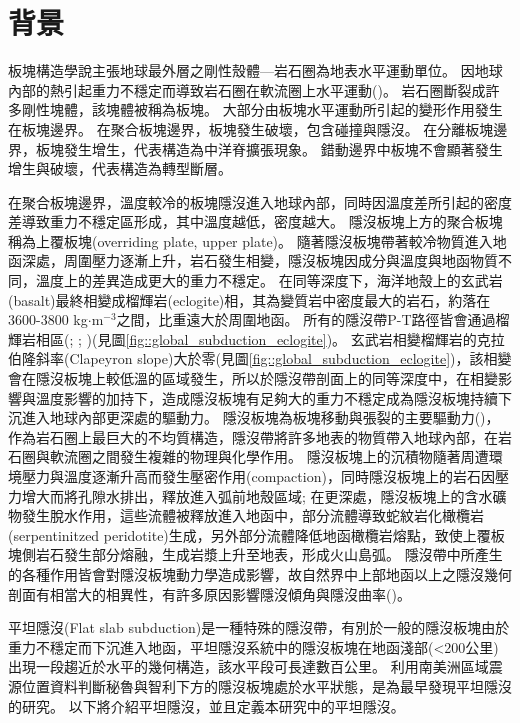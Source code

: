 \section{背景}\label{背景}

板塊構造學說主張地球最外層之剛性殼體---岩石圈為地表水平運動單位。
因地球內部的熱引起重力不穩定而導致岩石圈在軟流圈上水平運動(\citealp{jordan1978composition})。
岩石圈斷裂成許多剛性塊體，該塊體被稱為板塊。
大部分由板塊水平運動所引起的變形作用發生在板塊邊界。
在聚合板塊邊界，板塊發生破壞，包含碰撞與隱沒。
在分離板塊邊界，板塊發生增生，代表構造為中洋脊擴張現象。
錯動邊界中板塊不會顯著發生增生與破壞，代表構造為轉型斷層。

在聚合板塊邊界，溫度較冷的板塊隱沒進入地球內部，同時因溫度差所引起的密度差導致重力不穩定區形成，其中溫度越低，密度越大。
隱沒板塊上方的聚合板塊稱為上覆板塊(overriding plate, upper plate)。
隨著隱沒板塊帶著較冷物質進入地函深處，周圍壓力逐漸上升，岩石發生相變，隱沒板塊因成分與溫度與地函物質不同，溫度上的差異造成更大的重力不穩定。
在同等深度下，海洋地殼上的玄武岩(basalt)最終相變成榴輝岩(eclogite)相，其為變質岩中密度最大的岩石，約落在3600-3800 kg$\cdot$m$^{-3}$之間，比重遠大於周圍地函。
所有的隱沒帶P-T路徑皆會通過榴輝岩相區(\citealp{gerya2002exhumation}; \citealp{syracuse2010global}; \citealp{penniston2015global})(見圖\ref{fig::global_subduction_eclogite})。
玄武岩相變榴輝岩的克拉伯隆斜率(Clapeyron slope)大於零(見圖\ref{fig::global_subduction_eclogite})，該相變會在隱沒板塊上較低溫的區域發生，所以於隱沒帶剖面上的同等深度中，在相變影響與溫度影響的加持下，造成隱沒板塊有足夠大的重力不穩定成為隱沒板塊持續下沉進入地球內部更深處的驅動力。
隱沒板塊為板塊移動與張裂的主要驅動力(\citealp{turcotte2002geodynamics})，作為岩石圈上最巨大的不均質構造，隱沒帶將許多地表的物質帶入地球內部，在岩石圈與軟流圈之間發生複雜的物理與化學作用。
隱沒板塊上的沉積物隨著周遭環境壓力與溫度逐漸升高而發生壓密作用(compaction)，同時隱沒板塊上的岩石因壓力增大而將孔隙水排出，釋放進入弧前地殼區域; 在更深處，隱沒板塊上的含水礦物發生脫水作用，這些流體被釋放進入地函中，部分流體導致蛇紋岩化橄欖岩(serpentinitzed peridotite)生成，另外部分流體降低地函橄欖岩熔點，致使上覆板塊側岩石發生部分熔融，生成岩漿上升至地表，形成火山島弧。
隱沒帶中所產生的各種作用皆會對隱沒板塊動力學造成影響，故自然界中上部地函以上之隱沒幾何剖面有相當大的相異性，有許多原因影響隱沒傾角與隱沒曲率(\citealp{schellart2020control})。

平坦隱沒(Flat slab subduction)是一種特殊的隱沒帶，有別於一般的隱沒板塊由於重力不穩定而下沉進入地函，平坦隱沒系統中的隱沒板塊在地函淺部(<200公里)出現一段趨近於水平的幾何構造，該水平段可長達數百公里。
\citet{barazangi1976}利用南美洲區域震源位置資料判斷秘魯與智利下方的隱沒板塊處於水平狀態，是為最早發現平坦隱沒的研究。
以下將介紹平坦隱沒，並且定義本研究中的平坦隱沒。

